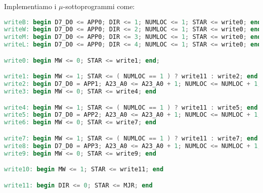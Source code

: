 \documentclass[a4paper,11pt]{article}
\begin{document}
Implementiamo i $\mu$-sottoprogrammi come:
\begin{lstlisting}[language=verilog, style=codestyle]	
writeB: begin D7_D0 <= APP0; DIR <= 1; NUMLOC <= 1; STAR <= write0; end 
writeW: begin D7_D0 <= APP0; DIR <= 2; NUMLOC <= 1; STAR <= write0; end
writeM: begin D7_D0 <= APP0; DIR <= 3; NUMLOC <= 1; STAR <= write0; end
writeL: begin D7_D0 <= APP0; DIR <= 4; NUMLOC <= 1; STAR <= write0; end

write0: begin MW <= 0; STAR <= write1; end;

write1: begin MW <= 1; STAR <= ( NUMLOC == 1 ) ? write11 : write2; end
write2: begin D7_D0 = APP1; A23_A0 <= A23_A0 + 1; NUMLOC <= NUMLOC + 1; STAR <= write3; end
write3: begin MW <= 0; STAR <= write4; end

write4: begin MW <= 1; STAR <= ( NUMLOC == 1 ) ? write11 : write5; end
write5: begin D7_D0 = APP2; A23_A0 <= A23_A0 + 1; NUMLOC <= NUMLOC + 1; STAR <= write6; end
write6: begin MW <= 0; STAR <= write7; end

write7: begin MW <= 1; STAR <= ( NUMLOC == 1 ) ? write11 : write7; end
write8: begin D7_D0 = APP3; A23_A0 <= A23_A0 + 1; NUMLOC <= NUMLOC + 1; STAR <= write8; end
write9: begin MW <= 0; STAR <= write9; end

write10: begin MW <= 1; STAR <= write11; end

write11: begin DIR <= 0; STAR <= MJR; end
\end{lstlisting}
\end{document}
